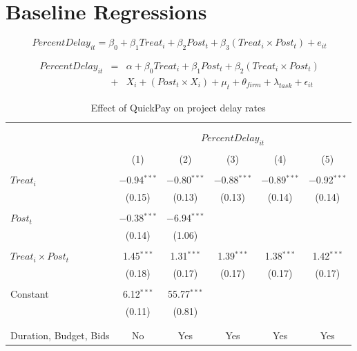 \documentclass[
]{article}
\begin{document}
\hypertarget{baseline-regressions}{%
\section{Baseline Regressions}\label{baseline-regressions}}

\[ PercentDelay_{it} = \beta_0 + \beta_1 Treat_i + \beta_2 Post_t + \beta_3 (Treat_i \times Post_t) + e_{it}\]

\[ \begin{aligned} PercentDelay_{it} &=& \alpha+\beta_0 Treat_i + \beta_1 Post_t + \beta_2 (Treat_i \times Post_t)\\
&+&  X_i + (Post_t \times X_i) + \mu_t + \theta_{firm} + \lambda_{task}+ \epsilon_{it}
\end{aligned}\]

\begin{table}[H] \centering 
  \caption{Effect of QuickPay on project delay rates} 
  \label{} 
\small 
\begin{tabular}{@{\extracolsep{-2pt}}lccccc} 
\\[-1.8ex]\hline 
\hline \\[-1.8ex] 
\\[-1.8ex] & \multicolumn{5}{c}{$PercentDelay_{it}$} \\ 
\\[-1.8ex] & (1) & (2) & (3) & (4) & (5)\\ 
\hline \\[-1.8ex] 
 $Treat_i$ & $-$0.94$^{***}$ & $-$0.80$^{***}$ & $-$0.88$^{***}$ & $-$0.89$^{***}$ & $-$0.92$^{***}$ \\ 
  & (0.15) & (0.13) & (0.13) & (0.14) & (0.14) \\ 
  & & & & & \\ 
 $Post_t$ & $-$0.38$^{***}$ & $-$6.94$^{***}$ &  &  &  \\ 
  & (0.14) & (1.06) &  &  &  \\ 
  & & & & & \\ 
 $Treat_i \times Post_t$ & 1.45$^{***}$ & 1.31$^{***}$ & 1.39$^{***}$ & 1.38$^{***}$ & 1.42$^{***}$ \\ 
  & (0.18) & (0.17) & (0.17) & (0.17) & (0.17) \\ 
  & & & & & \\ 
 Constant & 6.12$^{***}$ & 55.77$^{***}$ &  &  &  \\ 
  & (0.11) & (0.81) &  &  &  \\ 
  & & & & & \\ 
\hline \\[-1.8ex] 
Duration, Budget, Bids & No & Yes & Yes & Yes & Yes \\ 

\end{tabular}
\end{table}
\end{document}
